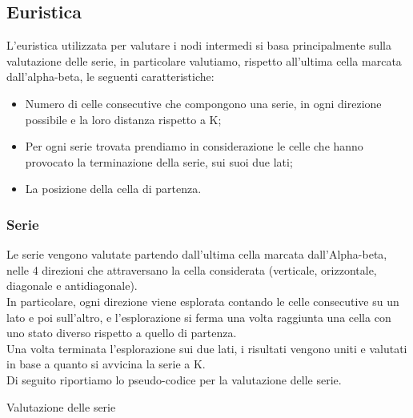 \subsection{Euristica}
L'euristica utilizzata per valutare i nodi intermedi si basa principalmente sulla valutazione delle serie, in particolare valutiamo, rispetto all'ultima cella marcata dall'alpha-beta, le seguenti caratteristiche:
\begin{itemize}
    \item Numero di celle consecutive che compongono una serie, in ogni direzione possibile e la loro distanza rispetto a K;
    \item Per ogni serie trovata prendiamo in considerazione le celle che hanno provocato la terminazione della serie, sui suoi due lati;
    \item La posizione della cella di partenza.
\end{itemize}

\subsubsection{Serie}
Le serie vengono valutate partendo dall'ultima cella marcata  dall'Alpha-beta, nelle 4 direzioni che attraversano la cella considerata (verticale, orizzontale, diagonale e antidiagonale).\\
In particolare, ogni direzione viene esplorata contando le celle consecutive su un lato e poi sull'altro, e l'esplorazione si ferma una volta raggiunta una cella con uno stato diverso rispetto a quello di partenza.\\
Una volta terminata l'esplorazione sui due lati, i risultati vengono uniti e valutati in base a quanto si avvicina la serie a K.\\
Di seguito riportiamo lo pseudo-codice per la valutazione delle serie.
\begin{algorithm}[H]
    \caption{Valutazione delle serie}\label{alg:cap}

    \begin{algorithmic}[1]
         
         
         
        \EndIf
        \State {}
        \EndFunction
    \end{algorithmic}
\end{algorithm}

